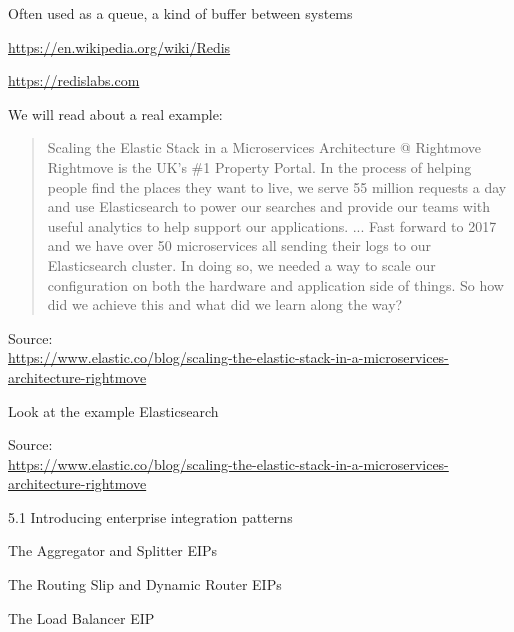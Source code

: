 \documentclass[Screen16to9,17pt]{foils}
\begin{document}
\begin{list2}
\item Often used as a queue, a kind of buffer between systems
\item \url{https://en.wikipedia.org/wiki/Redis}
\item \url{https://redislabs.com}
\end{list2}



We will read about a real example:

\begin{quote}
Scaling the Elastic Stack in a Microservices Architecture @ Rightmove\\
Rightmove is the UK's \#1 Property Portal. In the process of helping people find the places they want to live, we serve 55 million requests a day and use Elasticsearch to power our searches and provide our teams with useful analytics to help support our applications.
...
Fast forward to 2017 and we have over 50 microservices all sending their logs to our Elasticsearch cluster. In doing so, we needed a way to scale our configuration on both the hardware and application side of things. So how did we achieve this and what did we learn along the way?
\end{quote}
Source:\\
{\footnotesize\url{https://www.elastic.co/blog/scaling-the-elastic-stack-in-a-microservices-architecture-rightmove}}


Look at the example Elasticsearch

Source:\\
{\footnotesize\url{https://www.elastic.co/blog/scaling-the-elastic-stack-in-a-microservices-architecture-rightmove}}







\begin{list2}
\item 5.1 Introducing enterprise integration patterns
\item The Aggregator and Splitter EIPs
\item The Routing Slip and Dynamic Router EIPs
\item The Load Balancer EIP
\end{list2}
\end{document}
